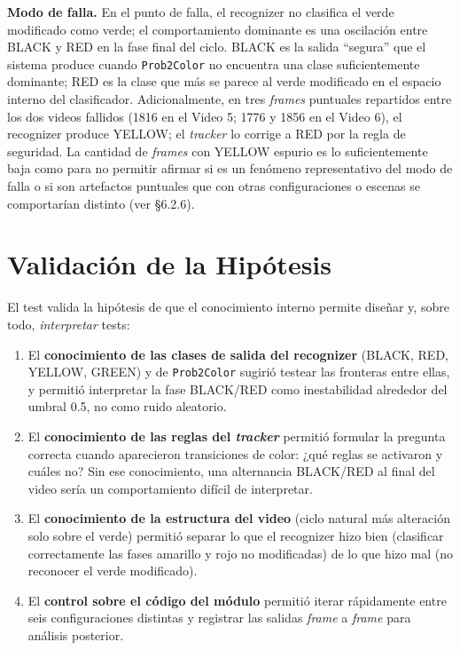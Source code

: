 \textbf{Modo de falla.} En el punto de falla, el recognizer no clasifica el verde modificado como verde; el comportamiento dominante es una oscilación entre BLACK y RED en la fase final del ciclo. BLACK es la salida ``segura'' que el sistema produce cuando \texttt{Prob2Color} no encuentra una clase suficientemente dominante; RED es la clase que más se parece al verde modificado en el espacio interno del clasificador. Adicionalmente, en tres \textit{frames} puntuales repartidos entre los dos videos fallidos (1816 en el Video 5; 1776 y 1856 en el Video 6), el recognizer produce YELLOW; el \textit{tracker} lo corrige a RED por la regla de seguridad. La cantidad de \textit{frames} con YELLOW espurio es lo suficientemente baja como para no permitir afirmar si es un fenómeno representativo del modo de falla o si son artefactos puntuales que con otras configuraciones o escenas se comportarían distinto (ver §6.2.6).

\section{Validación de la Hipótesis}

El test valida la hipótesis de que el conocimiento interno permite diseñar y, sobre todo, \textit{interpretar} tests:

\begin{enumerate}
    \item El \textbf{conocimiento de las clases de salida del recognizer} (BLACK, RED, YELLOW, GREEN) y de \texttt{Prob2Color} sugirió testear las fronteras entre ellas, y permitió interpretar la fase BLACK/RED como inestabilidad alrededor del umbral 0.5, no como ruido aleatorio.

    \item El \textbf{conocimiento de las reglas del \textit{tracker}} permitió formular la pregunta correcta cuando aparecieron transiciones de color: ¿qué reglas se activaron y cuáles no? Sin ese conocimiento, una alternancia BLACK/RED al final del video sería un comportamiento difícil de interpretar.

    \item El \textbf{conocimiento de la estructura del video} (ciclo natural más alteración solo sobre el verde) permitió separar lo que el recognizer hizo bien (clasificar correctamente las fases amarillo y rojo no modificadas) de lo que hizo mal (no reconocer el verde modificado).

    \item El \textbf{control sobre el código del módulo} permitió iterar rápidamente entre seis configuraciones distintas y registrar las salidas \textit{frame} a \textit{frame} para análisis posterior.
\end{enumerate}

